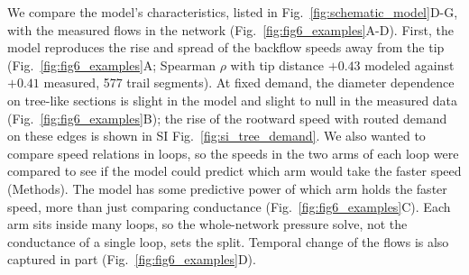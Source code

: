 We compare the model's characteristics, listed in Fig.~\ref{fig:schematic_model}D-G, with the measured flows in the network (Fig.~\ref{fig:fig6_examples}A-D).
First, the model reproduces the rise and spread of the backflow speeds away from the tip (Fig.~\ref{fig:fig6_examples}A; Spearman $\rho$ with tip distance $+0.43$ modeled against $+0.41$ measured, 577 trail segments).
At fixed demand, the diameter dependence on tree-like sections is slight in the model and slight to null in the measured data (Fig.~\ref{fig:fig6_examples}B); the rise of the rootward speed with routed demand on these edges is shown in SI Fig.~\ref{fig:si_tree_demand}.
We also wanted to compare speed relations in loops, so the speeds in the two arms of each loop were compared to see if the model could predict which arm would take the faster speed (Methods).
The model has some predictive power of which arm holds the faster speed, more than just comparing conductance (Fig.~\ref{fig:fig6_examples}C).
Each arm sits inside many loops, so the whole-network pressure solve, not the conductance of a single loop, sets the split.
Temporal change of the flows is also captured in part (Fig.~\ref{fig:fig6_examples}D).
